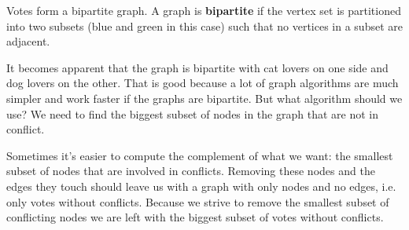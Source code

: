 \begin{marginfigure}[0.01in]
    \caption{Votes form a bipartite graph. A graph is \textbf{bipartite} if the vertex set is partitioned into two subsets (blue and green in this case) such that no vertices in a subset are adjacent.}
	\label{votes_conflict}
\end{marginfigure}

It becomes apparent that the graph is bipartite with cat lovers on one side and dog lovers on the other. That is good because a lot of graph algorithms are much simpler and work faster if the graphs are bipartite. But what algorithm should we use? We need to find the biggest subset of nodes in the graph that are not in conflict. 

Sometimes it's easier to compute the complement of what we want: the smallest subset of nodes that are involved in conflicts. Removing these nodes and the edges they touch should leave us with a graph with only nodes and no edges, i.e. only votes without conflicts. Because we strive to remove the smallest subset of conflicting nodes we are left with the biggest subset of votes without conflicts.

